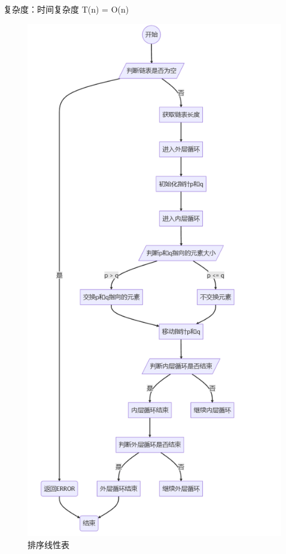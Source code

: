 \documentclass[supercite]{Experimental_Report}
\theoremstyle{definition}
\begin{document}
\begin{enumerate}
	复杂度：时间复杂度 T(n) = O(n)
\begin{figure}[htbp]
	\centering
	\begin{minipage}{0.7\linewidth}
		\centering
		\includegraphics[width=0.9\linewidth]{images/排序表.png}
	\end{minipage}
	\caption{排序线性表}
	\label{fig1-3}
\end{figure}



\end{enumerate}
\end{document}
